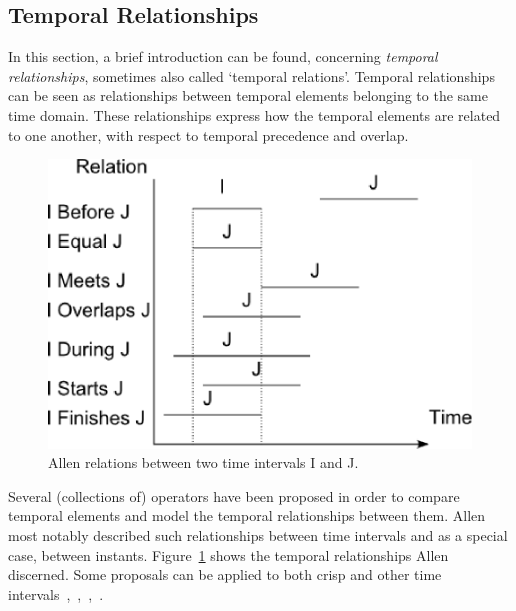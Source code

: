 \subsection{\label{allen-crisp}Temporal Relationships}
In this section, a brief introduction can be found, concerning \emph{temporal relationships}, sometimes also called `temporal relations'\cite{Billiet:Pons:Matthe:DeTre:Pons:2011:BipolarFuzzy}. Temporal relationships can be seen as relationships between temporal elements belonging to the same time domain. These relationships express how the temporal elements are related to one another, with respect to temporal precedence and overlap.

\def\JPicScale{0.5}
\begin{figure}[h]
\centering
\includegraphics[scale=0.5]{graphs/allen.eps}
\caption{Allen relations between two time intervals I and J.}
\label{fig:allen}
\end{figure}

Several (collections of) operators have been proposed in order to compare temporal elements and model the temporal relationships between them. Allen~\cite{Allen83} most notably described such relationships between time intervals and as a special case, between instants. Figure~\ref{fig:allen} shows the temporal relationships Allen discerned. Some proposals can be applied to both crisp and other time intervals~\cite{ohlbach2004},~\cite{nagypal2003},~\cite{schockaert08},~\cite{garrido2009}.

